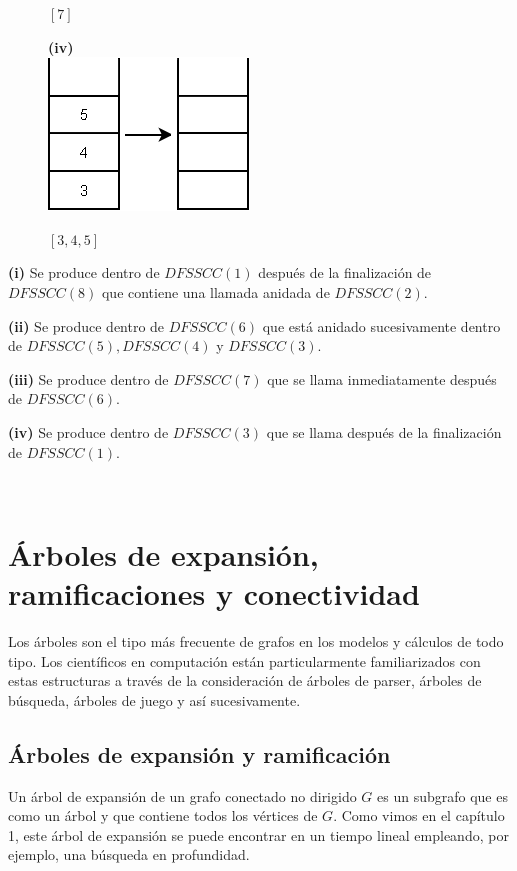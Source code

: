 \documentclass[10pt,a5paper]{book}
\begin{document}
\begin{figure}[H]
\begin{center}
{}
\hspace*{1in}
\parbox{2cm}
{
$ [7] $
}
\end{center}
\begin{center}
\parbox{3cm}
{
  \textbf{(iv)}\\
    \includegraphics[scale=0.5]{Fig1_21_b4.png}
}
\hspace*{1in}
\parbox{2cm}
{
$ [3,4,5] $
}
\end{center}
\end{figure}

\textbf{(i)} Se produce dentro de $DFSSCC(1)$ después de la finalización de $DFSSCC(8)$ que contiene una llamada anidada de $DFSSCC(2)$.

\textbf{(ii)} Se produce dentro de $DFSSCC(6)$ que está anidado sucesivamente dentro de $DFSSCC(5), DFSSCC(4)$ y $ DFSSCC(3)$.

\textbf{(iii)} Se produce dentro de $DFSSCC(7)$ que se llama inmediatamente después de $DFSSCC(6)$.

\textbf{(iv)} Se produce dentro de $DFSSCC(3)$ que se llama después de la finalización de $DFSSCC(1)$.

\hrulefill{}\\

\chapter[Árbol exp. , ramificacion y conect.]{Árboles de expansión, ramificaciones y conectividad}

Los árboles son el tipo más frecuente de grafos en los modelos y cálculos de todo tipo. Los científicos en computación están particularmente familiarizados con estas estructuras a través de la consideración de árboles de parser, árboles de búsqueda, árboles de juego y así sucesivamente.

\section{Árboles de expansión y ramificación}

Un árbol de expansión de un grafo conectado no dirigido $G$ es un subgrafo que es como un árbol y que contiene todos los vértices de $G$. Como vimos en el capítulo 1, este árbol de expansión se puede encontrar en un tiempo lineal empleando, por ejemplo, una búsqueda en profundidad.
\end{document}
